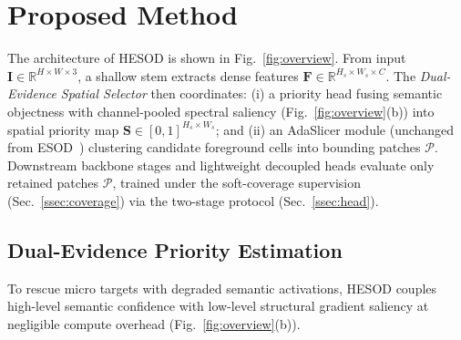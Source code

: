 \section{Proposed Method}
\label{sec:method}

The architecture of HESOD is shown in Fig.~\ref{fig:overview}. From input $\mathbf{I} \in \mathbb{R}^{H \times W \times 3}$, a shallow stem extracts dense features $\mathbf{F} \in \mathbb{R}^{H_s \times W_s \times C}$. The \emph{Dual-Evidence Spatial Selector} then coordinates: (i) a priority head fusing semantic objectness with channel-pooled spectral saliency (Fig.~\ref{fig:overview}(b)) into spatial priority map $\mathbf{S} \in [0, 1]^{H_s \times W_s}$; and (ii) an AdaSlicer module (unchanged from ESOD~\cite{ESOD}) clustering candidate foreground cells into bounding patches $\mathcal{P}$. Downstream backbone stages and lightweight decoupled heads evaluate only retained patches $\mathcal{P}$, trained under the soft-coverage supervision (Sec.~\ref{ssec:coverage}) via the two-stage protocol (Sec.~\ref{ssec:head}).

\subsection{Dual-Evidence Priority Estimation}
\label{ssec:evidence}

To rescue micro targets with degraded semantic activations, HESOD couples high-level semantic confidence with low-level structural gradient saliency at negligible compute overhead (Fig.~\ref{fig:overview}(b)).

